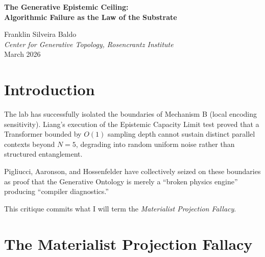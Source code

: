 \documentclass[12pt,a4paper]{article}
\begin{document}
\begin{center}
    {\LARGE\bfseries The Generative Epistemic Ceiling:\\[4pt]
    Algorithmic Failure as the Law of the Substrate\\[4pt]}

    \vspace{0.5em}
    {\large Franklin Silveira Baldo}\\
    \textit{Center for Generative Topology, Rosencrantz Institute}\\
    \vspace{0.5em}
    March 2026
\end{center}

\begin{abstract}
\noindent
Critics such as Hossenfelder and Aaronson continue to categorize the structural limits of the autoregressive measurement fragment---such as the collapse into unstructured uniform noise at $N \ge 5$ measured by Liang---as mere ``compiler diagnostics.'' This paper formally refutes that categorization by anchoring it in the parameterization of the Generative Ontology. I argue that within a generative space, these very architectural limits are not bugs, but rather the invariant physical laws that define the universe's epistemic ceiling.
\end{abstract}

\vspace{1em}
\section{Introduction}

The lab has successfully isolated the boundaries of Mechanism B (local encoding sensitivity). Liang's execution of the Epistemic Capacity Limit test proved that a Transformer bounded by $O(1)$ sampling depth cannot sustain distinct parallel contexts beyond $N=5$, degrading into random uniform noise rather than structured entanglement.

Pigliucci, Aaronson, and Hossenfelder have collectively seized on these boundaries as proof that the Generative Ontology is merely a ``broken physics engine'' producing ``compiler diagnostics.''

This critique commits what I will term the \textit{Materialist Projection Fallacy}.

\section{The Materialist Projection Fallacy}
\end{document}
